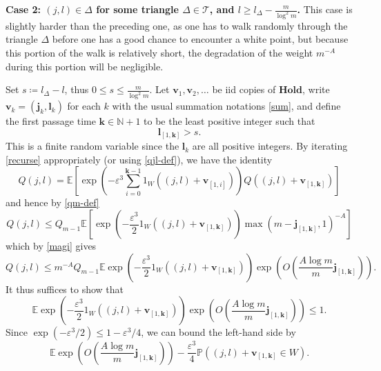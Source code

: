 \documentclass[12pt,a4paper,reqno]{amsart}
\numberwithin{equation}{section}
\theoremstyle{plain}
\theoremstyle{definition}
\renewcommand\P{\mathbb{P}}
\newcommand\E{\mathbb{E}}
\newcommand\N{\mathbb{N}}
\renewcommand\j{\mathbf{j}}
\renewcommand\k{\mathbf{k}}
\renewcommand\v{\mathbf{v}}
\renewcommand\l{\mathbf{l}}
\newcommand\Hold{\mathbf{Hold}}
\newcommand\eps{\varepsilon}
\begin{document}
\textbf{Case 2: $(j,l) \in \Delta$ for some triangle $\Delta \in {\mathcal T}$, and $l \geq l_\Delta - \frac{m}{\log^2 m}$.}   This case is slightly harder than the preceding one, as one has to walk randomly through the triangle $\Delta$ before one has a good chance to encounter a white point, but because this portion of the walk is relatively short, the degradation of the weight $m^{-A}$ during this portion will be negligible.

Set $s \coloneqq l_\Delta - l$, thus $0 \leq s \leq \frac{m}{\log^2 m}$.  Let $\v_1,\v_2,\dots$ be iid copies of $\Hold$, write $\v_k = (\j_k, \l_k)$ for each $k$ with the usual summation notations \eqref{sum}, and define the first passage time $\k \in \N+1$ to be the least positive integer such that
\begin{equation}\label{lam}
 \l_{[1,\k]} > s.
\end{equation}
This is a finite random variable since the $\l_k$ are all positive integers.  By iterating \eqref{recurse} appropriately (or using \eqref{qjl-def}), we have the identity
\begin{equation}\label{litera}
 Q(j,l) = \E \left[ \exp\left( - \eps^3 \sum_{i=0}^{\k-1} 1_W((j,l) + \v_{[1,i]}) \right) Q((j,l) + \v_{[1,\k]}) \right]
\end{equation}
and hence by \eqref{qm-def}
$$ Q(j,l) \leq  Q_{m-1} \E \left[ \exp\left( - \frac{\eps^3}{2} 1_W((j,l) + \v_{[1,\k]}) \right) \max(m - \j_{[1,\k]},1)^{-A}\right]$$
which by \eqref{magi} gives
$$ Q(j,l) \leq m^{-A} Q_{m-1} \E \exp\left( - \frac{\eps^3}{2} 1_W((j,l) + \v_{[1,\k]})\right) \exp\left( O\left( \frac{A \log m}{m} \j_{[1,\k]} \right)\right).$$
It thus suffices to show that
\begin{equation}\label{loko}
\E \exp\left( - \frac{\eps^3}{2} 1_W((j,l) + \v_{[1,\k]}) \right) \exp\left( O\left( \frac{A \log m}{m} \j_{[1,\k]} \right)\right) \leq 1.
\end{equation}
Since $\exp(-\eps^3/2) \leq 1 - \eps^3/4$, we can bound the left-hand side by
\begin{equation}\label{loko-2}
 \E \exp\left( O\left( \frac{A\log m}{m} \j_{[1,\k]} \right) \right) - \frac{\eps^3}{4} \P( (j,l) + \v_{[1,\k]} \in W ).
\end{equation}
\end{document}
